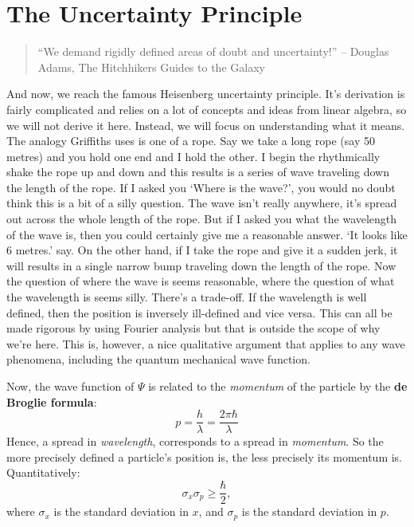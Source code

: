 \documentclass{article}
\begin{document}
\section{The Uncertainty Principle}
\begin{quote}
``We demand rigidly defined areas of doubt and uncertainty!'' -- Douglas Adams, The Hitchhikers Guides to the Galaxy
\end{quote}
And now, we reach the famous Heisenberg uncertainty principle. It's derivation is fairly complicated and relies on a lot of concepts and ideas from linear algebra, so we will not derive it here. Instead, we will focus on understanding what it means. The analogy Griffiths uses is one of a rope. Say we take a long rope (say 50 metres) and you hold one end and I hold the other. I begin the rhythmically shake the rope up and down and this results is a series of wave traveling down the length of the rope. If I asked you `Where is the wave?', you would no doubt think this is a bit of a silly question. The wave isn't really anywhere, it's spread out across the whole length of the rope. But if I asked you what the wavelength of the wave is, then you could certainly give me a reasonable answer. `It looks like 6 metres.' say. On the other hand, if I take the rope and give it a sudden jerk, it will results in a single narrow bump traveling down the length of the rope. Now the question of where the wave is seems reasonable, where the question of what the wavelength is seems silly. There's a trade-off. If the wavelength is well defined, then the position is inversely ill-defined and vice versa. This can all be made rigorous by using Fourier analysis but that is outside the scope of why we're here. This is, however, a nice qualitative argument that applies to any wave phenomena, including the quantum mechanical wave function.

Now, the wave function of $\Psi$ is related to the \emph{momentum} of the particle by the \textbf{de Broglie formula}:
\begin{equation}
p = \frac{h}{\lambda} = \frac{2\pi\hbar}{\lambda}
\end{equation}
Hence, a spread in \emph{wavelength}, corresponds to a spread in \emph{momentum}. So the more precisely defined a particle's position is, the less precisely its momentum is. Quantitatively:
\begin{equation}
\boxed{\sigma_{x}\sigma_{p} \geq \frac{\hbar}{2}},
\end{equation}
where $\sigma_{x}$ is the standard deviation in $x$, and $\sigma_{p}$ is the standard deviation in $p$. 
\end{document}
